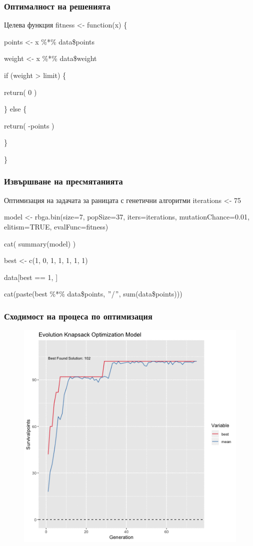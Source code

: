 \documentclass{beamer}
\begin{document}
\begin{frame}
\frametitle{Оптималност на решенията}
\begin{block}{Целева функция}
fitness <- function(x) \{

	points <- x \%*\% data\$points

	weight <- x \%*\% data\$weight

	if (weight > limit) \{

		return( 0 )

	\} else \{

		return( -points )

	\}

\}
\end{block}
\end{frame}

\begin{frame}
\frametitle{Извършване на пресмятанията}
\begin{block}{Оптимизация на задачата за раницата с генетични алгоритми}
iterations <- 75

model <- rbga.bin(size=7, popSize=37, iters=iterations, mutationChance=0.01, elitism=TRUE, evalFunc=fitness)

cat( summary(model) )

best <- c(1, 0, 1, 1, 1, 1, 1)

data[best == 1, ]

cat(paste(best \%*\% data\$points, $"$/$"$, sum(data\$points)))
\end{block}
\end{frame}

\begin{frame}
\frametitle{Сходимост на процеса по оптимизация}
\begin{figure}[]\includegraphics[width=\textwidth,height=0.75\textheight]{pic0061}\end{figure}
\end{frame}
\end{document}
